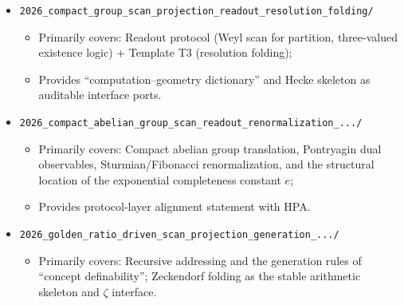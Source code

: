 \begin{itemize}
  \item \texttt{2026\_compact\_group\_scan\_projection\_readout\_resolution\_folding/}
  \begin{itemize}
    \item Primarily covers: Readout protocol (Weyl scan for partition, three-valued existence logic) + Template T3 (resolution folding);
    \item Provides ``computation--geometry dictionary'' and Hecke skeleton as auditable interface ports.
  \end{itemize}

  \item \texttt{2026\_compact\_abelian\_group\_scan\_readout\_renormalization\_.../}
  \begin{itemize}
    \item Primarily covers: Compact abelian group translation, Pontryagin dual observables, Sturmian/Fibonacci renormalization, and the structural location of the exponential completeness constant $e$;
    \item Provides protocol-layer alignment statement with HPA.
  \end{itemize}

  \item \texttt{2026\_golden\_ratio\_driven\_scan\_projection\_generation\_.../}
  \begin{itemize}
    \item Primarily covers: Recursive addressing and the generation rules of ``concept definability''; Zeckendorf folding as the stable arithmetic skeleton and $\zeta$ interface.
  \end{itemize}
\end{itemize}

